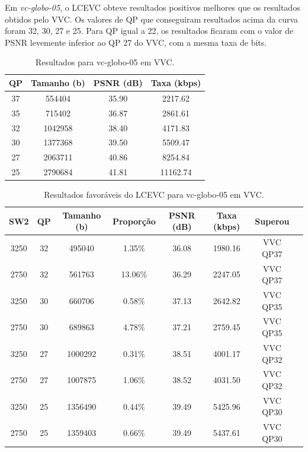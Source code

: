 Em \textit{vc-globo-05}, o \acrshort{LCEVC} obteve resultados positivos melhores que
os resultados obtidos pelo \acrshort{VVC}. Os valores de QP que conseguiram resultados
acima da curva foram 32, 30, 27 e 25. Para QP igual a 22, os resultados ficaram com o
valor de \acrshort{PSNR} levemente inferior ao QP 27 do \acrshort{VVC}, com a mesma
taxa de bits.

\begin{table}[h]
    \centering
    \begin{tabular}{|c|c|c|c|}
        \hline
        \textbf{QP} & \textbf{Tamanho (b)} & \textbf{PSNR (dB)} & \textbf{Taxa (kbps)} \\
        \hline
        37 & 554404 & 35.90 & 2217.62 \\
        35 & 715402 & 36.87 & 2861.61 \\
        32 & 1042958 & 38.40 & 4171.83 \\
        30 & 1377368 & 39.50 & 5509.47 \\
        27 & 2063711 & 40.86 & 8254.84 \\
        25 & 2790684 & 41.81 & 11162.74 \\
        \hline
    \end{tabular}
    \caption{Resultados para vc-globo-05 em VVC.}
    \label{tab:vc-globo-05-vvc}
\end{table}

\begin{table}[h]
    \centering
    \label{tab:vc-globo-05-vvc-lcevc}
    \begin{tabular}{|c|c|c|c|c|c|c|c|}
        \hline
        \textbf{SW2} & \textbf{QP} & \textbf{Tamanho (b)} & \textbf{Proporção} & \textbf{PSNR (dB)} & \textbf{Taxa (kbps)} & \textbf{Superou} \\
        \hline
        3250 & 32 & 495040 & 1.35\% & 36.08 & 1980.16 & VVC QP37 \\
        2750 & 32 & 561763 & 13.06\% & 36.29 & 2247.05 & VVC QP37 \\
        3250 & 30 & 660706 & 0.58\% & 37.13 & 2642.82 & VVC QP35 \\
        2750 & 30 & 689863 & 4.78\% & 37.21 & 2759.45 & VVC QP35 \\
        3250 & 27 & 1000292 & 0.31\% & 38.51 & 4001.17 & VVC QP32 \\
        2750 & 27 & 1007875 & 1.06\% & 38.52 & 4031.50 & VVC QP32 \\
        3250 & 25 & 1356490 & 0.44\% & 39.49 & 5425.96 & VVC QP30 \\
        2750 & 25 & 1359403 & 0.66\% & 39.49 & 5437.61 & VVC QP30 \\
        \hline
    \end{tabular}
    \caption{Resultados favoráveis do LCEVC para vc-globo-05 em VVC.}
\end{table}

